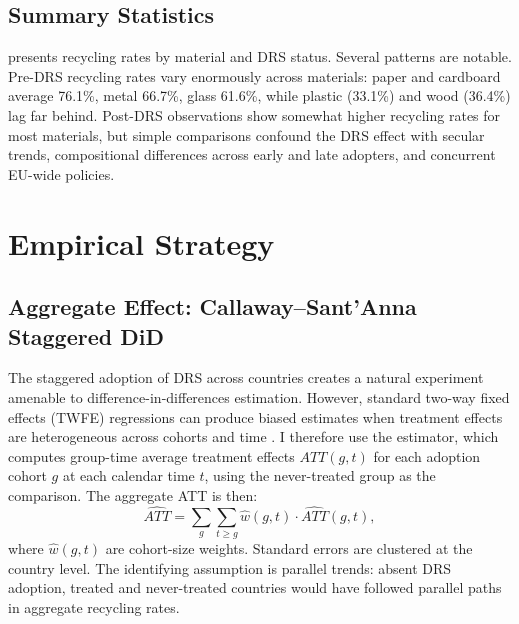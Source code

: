 \documentclass[12pt]{article}
\begin{document}
\subsection{Summary Statistics}

 presents recycling rates by material and DRS status. Several patterns are notable. Pre-DRS recycling rates vary enormously across materials: paper and cardboard average 76.1\%, metal 66.7\%, glass 61.6\%, while plastic (33.1\%) and wood (36.4\%) lag far behind. Post-DRS observations show somewhat higher recycling rates for most materials, but simple comparisons confound the DRS effect with secular trends, compositional differences across early and late adopters, and concurrent EU-wide policies.

\begin{table}[H]

\end{table}


\section{Empirical Strategy}
\label{sec:strategy}

\subsection{Aggregate Effect: Callaway--Sant'Anna Staggered DiD}

The staggered adoption of DRS across countries creates a natural experiment amenable to difference-in-differences estimation. However, standard two-way fixed effects (TWFE) regressions can produce biased estimates when treatment effects are heterogeneous across cohorts and time \citep{goodmanbacon2021difference, deChaisemartin2020two}. I therefore use the \citet{callaway2021difference} estimator, which computes group-time average treatment effects $ATT(g,t)$ for each adoption cohort $g$ at each calendar time $t$, using the never-treated group as the comparison. The aggregate ATT is then:
\begin{equation}
\widehat{ATT} = \sum_{g} \sum_{t \geq g} \hat{w}(g,t) \cdot \widehat{ATT}(g,t),
\label{eq:cs}
\end{equation}
where $\hat{w}(g,t)$ are cohort-size weights. Standard errors are clustered at the country level. The identifying assumption is parallel trends: absent DRS adoption, treated and never-treated countries would have followed parallel paths in aggregate recycling rates.
\end{document}
